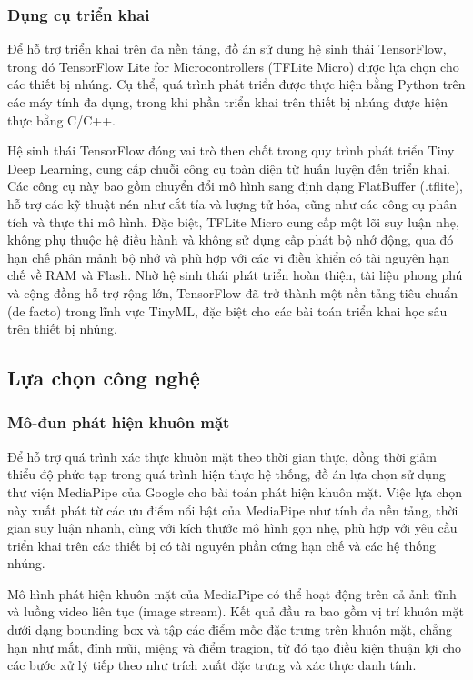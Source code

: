 \subsubsection{Dụng cụ triển khai}
Để hỗ trợ triển khai trên đa nền tảng, đồ án sử dụng hệ sinh thái TensorFlow, trong đó TensorFlow Lite for Microcontrollers (TFLite Micro) được lựa chọn cho các thiết bị nhúng. Cụ thể, quá trình phát triển được thực hiện bằng Python trên các máy tính đa dụng, trong khi phần triển khai trên thiết bị nhúng được hiện thực bằng C/C++.

Hệ sinh thái TensorFlow đóng vai trò then chốt trong quy trình phát triển Tiny Deep Learning, cung cấp chuỗi công cụ toàn diện từ huấn luyện đến triển khai. Các công cụ này bao gồm chuyển đổi mô hình sang định dạng FlatBuffer (.tflite), hỗ trợ các kỹ thuật nén như cắt tỉa và lượng tử hóa, cũng như các công cụ phân tích và thực thi mô hình. Đặc biệt, TFLite Micro cung cấp một lõi suy luận nhẹ, không phụ thuộc hệ điều hành và không sử dụng cấp phát bộ nhớ động, qua đó hạn chế phân mảnh bộ nhớ và phù hợp với các vi điều khiển có tài nguyên hạn chế về RAM và Flash. Nhờ hệ sinh thái phát triển hoàn thiện, tài liệu phong phú và cộng đồng hỗ trợ rộng lớn, TensorFlow đã trở thành một nền tảng tiêu chuẩn (de facto) trong lĩnh vực TinyML, đặc biệt cho các bài toán triển khai học sâu trên thiết bị nhúng.\cite{1_warden_2020_tinyml,14_10.1145/3776588}

\subsection{Lựa chọn công nghệ}
\subsubsection{Mô-đun phát hiện khuôn mặt}
Để hỗ trợ quá trình xác thực khuôn mặt theo thời gian thực, đồng thời giảm thiểu độ phức tạp trong quá trình hiện thực hệ thống, đồ án lựa chọn sử dụng thư viện MediaPipe của Google cho bài toán phát hiện khuôn mặt. Việc lựa chọn này xuất phát từ các ưu điểm nổi bật của MediaPipe như tính đa nền tảng, thời gian suy luận nhanh, cùng với kích thước mô hình gọn nhẹ, phù hợp với yêu cầu triển khai trên các thiết bị có tài nguyên phần cứng hạn chế và các hệ thống nhúng.

Mô hình phát hiện khuôn mặt của MediaPipe có thể hoạt động trên cả ảnh tĩnh và luồng video liên tục (image stream). Kết quả đầu ra bao gồm vị trí khuôn mặt dưới dạng bounding box và tập các điểm mốc đặc trưng trên khuôn mặt, chẳng hạn như mắt, đỉnh mũi, miệng và điểm tragion, từ đó tạo điều kiện thuận lợi cho các bước xử lý tiếp theo như trích xuất đặc trưng và xác thực danh tính.


